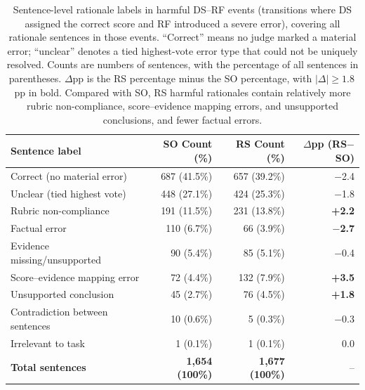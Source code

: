 \begin{table}[t]
\centering
\normalsize
\setlength{\tabcolsep}{10pt}
\begin{tabular}{lrrr}
\toprule
Sentence label & SO Count (\%) & RS Count (\%) & $\Delta$pp (RS$-$SO) \\
\midrule
Correct (no material error)     & 687 (41.5\%) & 657 (39.2\%) & $-$2.4 \\
Unclear (tied highest vote)     & 448 (27.1\%) & 424 (25.3\%) & $-$1.8 \\
Rubric non-compliance           & 191 (11.5\%) & 231 (13.8\%) & \textbf{+2.2} \\
Factual error                   & 110 (6.7\%)  & 66 (3.9\%)   & \textbf{$-$2.7} \\
Evidence missing/unsupported    & 90 (5.4\%)   & 85 (5.1\%)   & $-$0.4 \\
Score--evidence mapping error   & 72 (4.4\%)   & 132 (7.9\%)  & \textbf{+3.5} \\
Unsupported conclusion          & 45 (2.7\%)   & 76 (4.5\%)   & \textbf{+1.8} \\
Contradiction between sentences & 10 (0.6\%)   & 5 (0.3\%)    & $-$0.3 \\
Irrelevant to task              & 1 (0.1\%)    & 1 (0.1\%)    & 0.0 \\
\midrule
\textbf{Total sentences}        & \textbf{1,654 (100\%)} & \textbf{1,677 (100\%)} & -- \\
\bottomrule
\end{tabular}
\caption{Sentence-level rationale labels in harmful DS--RF events (transitions where DS assigned the correct score and RF introduced a severe error), covering all rationale sentences in those events. ``Correct'' means no judge marked a material error; ``unclear'' denotes a tied highest-vote error type that could not be uniquely resolved. Counts are numbers of sentences, with the percentage of all sentences in parentheses. $\Delta$pp is the RS percentage minus the SO percentage, with $|\Delta|\geq 1.8$\,pp in bold. Compared with SO, RS harmful rationales contain relatively more rubric non-compliance, score--evidence mapping errors, and unsupported conclusions, and fewer factual errors.}
\label{tab:full-sentence-errors}
\end{table}

